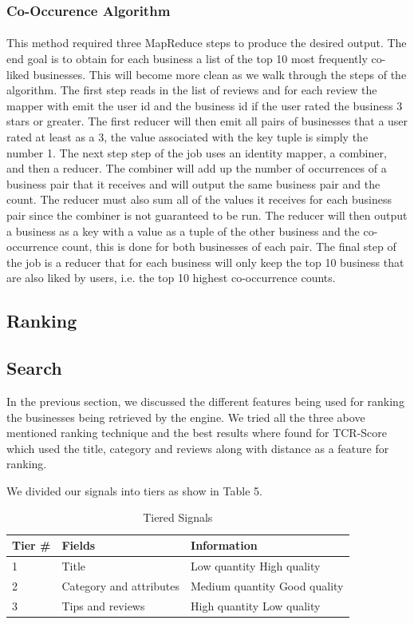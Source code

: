 \documentclass[paper=letter, fontsize=15pt]{article} %
\begin{document}
\subsubsection{Co-Occurence Algorithm}
\paragraph{}This method required three MapReduce steps to produce the desired output. The end goal is to obtain for each business a list of the top 10 most frequently co-liked businesses. This will become more clean as we walk through the steps of the algorithm. The first step reads in the list of reviews and for each review the mapper with emit the user id and the business id if the user rated the business 3 stars or greater. The first reducer will then emit all pairs of businesses that a user rated at least as a 3, the value associated with the key tuple is simply the number 1. The next step step of the job uses an identity mapper, a combiner, and then a reducer. The combiner will add up the number of occurrences of a business pair that it receives and will output the same business pair and the count. The reducer must also sum all of the values it receives for each business pair since the combiner is not guaranteed to be run. The reducer will then output a business as a key with a value as a tuple of the other business and the co-occurrence count, this is done for both businesses of each pair. The final step of the job is a reducer that for each business will only keep the top 10 business that are also liked by users, i.e. the top 10 highest co-occurrence counts. 

\subsection{Ranking}
\subsection{Search}
In the previous section, we discussed the different features being used for ranking the businesses being retrieved by the engine. We tried all the three above mentioned ranking technique and the best results where found for TCR-Score which used the title, category and reviews along with distance as a feature for ranking.

We divided our signals into tiers as show in Table 5.
\begin{table}[h!]
\centering
\begin{tabular}{|l|l|l|}
\hline
\textbf{Tier \#} & \textbf{Fields} & \textbf{Information} \\ \hline
1 & Title & Low quantity High quality \\ \hline
2 & Category and attributes & Medium quantity Good quality \\ \hline
3 & Tips and reviews & High quantity Low quality \\ \hline

\end{tabular}
\caption{Tiered Signals}
\end{table}
\end{document}
